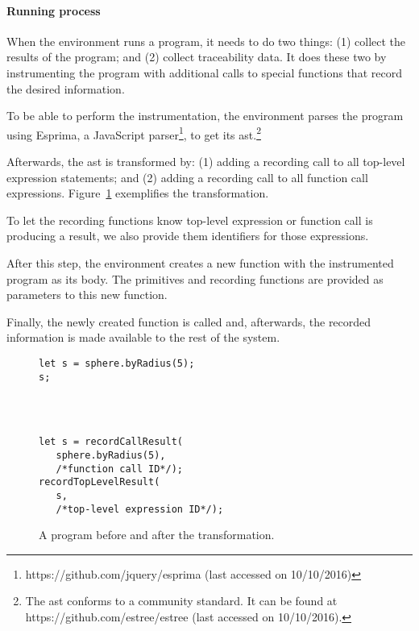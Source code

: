 \paragraph{Running process}
When the environment runs a program, it needs to do two things: (1) collect the results of the program; and (2) collect traceability data.
It does these two by instrumenting the program with additional calls to special functions that record the desired information.

To be able to perform the instrumentation, the environment parses the program using Esprima, a JavaScript parser\footnote{https://github.com/jquery/esprima (last accessed on 10/10/2016)}, to get its \gls{ast}.\footnote{The \gls{ast} conforms to a community standard. It can be found at https://github.com/estree/estree (last accessed on 10/10/2016).}

Afterwards, the \gls{ast} is transformed by: (1) adding a recording call to all top-level expression statements; and (2) adding a recording call to all function call expressions.
Figure~\ref{fig:instrument:example} exemplifies the transformation.

To let the recording functions know top-level expression or function call is producing a result, we also provide them identifiers for those expressions.

After this step, the environment creates a new function with the instrumented program as its body.
The primitives and recording functions are provided as parameters to this new function.

Finally, the newly created function is called and, afterwards, the recorded information is made available to the rest of the system.

\begin{figure}
  \centering
\begin{minipage}[t]{1.0\linewidth}
  \begin{verbatim}
let s = sphere.byRadius(5);
s;




  \end{verbatim}
\end{minipage}
\center{\rule{0.8\linewidth}{0.4pt}}
\begin{minipage}[t]{1.0\linewidth}
  \begin{verbatim}
let s = recordCallResult(
   sphere.byRadius(5),
   /*function call ID*/);
recordTopLevelResult(
   s,
   /*top-level expression ID*/);
  \end{verbatim}
\end{minipage}
  \caption{A program before and after the transformation.}
  \label{fig:instrument:example}
\end{figure}



